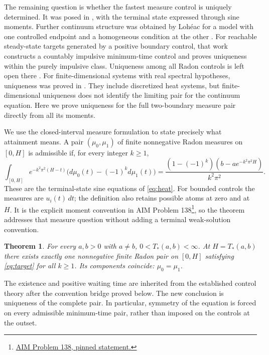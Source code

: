 \documentclass[11pt]{article}
\newtheorem{theorem}{Theorem}[section]
\theoremstyle{remark}
\begin{document}
The remaining question is whether the fastest measure control is uniquely
determined. It was posed in \cite[Section 6]{LTZ2017}, with the terminal
state expressed through sine moments. Further continuum structure was
obtained by Loh\'eac for a model with one controlled
endpoint and a homogeneous condition at the other \cite[Theorem 1]{L2021Heat}.
For reachable steady-state targets generated by a positive boundary control,
that work constructs a countably impulsive minimum-time control and proves
uniqueness within the purely impulsive class. Uniqueness among all Radon
controls is left open there \cite[Section 5]{L2021Heat}.
For finite-dimensional systems with real spectral hypotheses, uniqueness was proved in
\cite{LTZ2021}. They include discretized heat systems, but finite-dimensional
uniqueness does not identify the limiting pair for the continuum equation.
Here we prove uniqueness for the full two-boundary measure pair directly from
all its moments.

We use the closed-interval measure formulation to state precisely what
attainment means. A pair $(\mu_0,\mu_1)$ of finite nonnegative Radon measures
on $[0,H]$ is admissible if, for every integer $k\ge1$,
\begin{equation}\label{eq:target}
 \int_{[0,H]}e^{-k^2\pi^2(H-t)}
       \bigl(d\mu_0(t)-(-1)^k d\mu_1(t)\bigr)
 =\frac{(1-(-1)^k)(b-ae^{-k^2\pi^2H})}{k^2\pi^2}.
\end{equation}
These are the terminal-state sine equations of \eqref{eq:heat}. For bounded
controls the measures are $u_i(t)\,dt$; the definition also retains possible
atoms at zero and at $H$. It is the explicit moment convention in AIM
Problem 138\footnote{\href{https://github.com/MColbrook/AIM/blob/c9929805cece044705abaaebe1cebddac1ba11a6/problems/138-unique-minimum-time-positive-heat-control.md}{AIM Problem 138, pinned statement.}}, so the theorem addresses that measure question without adding
a terminal weak-solution convention.

\begin{theorem}\label{thm:main}
For every $a,b>0$ with $a\ne b$, $0<T_*(a,b)<\infty$. At
$H=T_*(a,b)$ there exists exactly one nonnegative finite Radon pair on
$[0,H]$ satisfying \eqref{eq:target} for all $k\ge1$. Its components
coincide: $\mu_0=\mu_1$.
\end{theorem}

The existence and positive waiting time are inherited from the established
control theory after the convention bridge proved below. The new conclusion
is uniqueness of the complete pair. In particular, symmetry of the equation
is forced on every admissible minimum-time pair, rather than imposed on the
controls at the outset.
\end{document}
